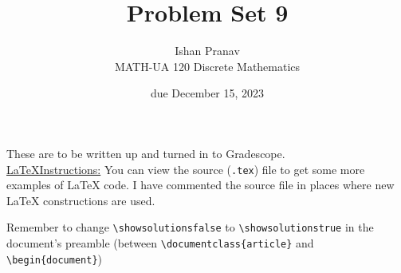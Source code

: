 \documentclass{article}
\title{Problem Set 9}
\author{%
    Ishan Pranav
\\  MATH-UA 120 Discrete Mathematics
}
\date{due December 15, 2023}
\newif\ifshowsolutions
\newcommand{\danger}{\marginpar[\hfill\dbend]{\dbend\hfill}}
\theoremstyle{definition}
\begin{document}
\maketitle
These are to be written up and turned in to Gradescope.\\

\ifshowsolutions
    \SetupExSheets{solution/print=true}
\else
    \danger
 \underline{ \LaTeX  Instructions:}  You can view the source (\texttt{.tex}) file to get some more examples of \LaTeX{} code.  I have commented the source file in places where new \LaTeX{} constructions are used.
  
  Remember to change \verb|\showsolutionsfalse| to \verb|\showsolutionstrue|
    in the document's preamble 
    (between \verb|\documentclass{article}| and \verb|\begin{document}|)
\fi
\end{document}
